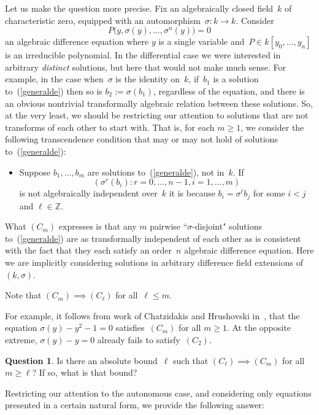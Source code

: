 \documentclass[\DocOpts]{amsart}
\theoremstyle{definition}
\newtheorem*{question*}{Question}
\def\ZZ{\mathbb{Z}}
\newcommand{\<}{\langle}
\renewcommand{\>}{\rangle}
\begin{document}
Let us make the question more precise.
Fix an algebraically closed field~$k$ of characteristic zero, equipped with an automorphism~$\sigma:k\to k$.
Consider
\begin{equation}
\label{generalde}
P\big(y, \sigma(y),\dots,\sigma^n(y)\big)=0\tag{E}
\end{equation}
an algebraic difference equation where $y$ is a single variable and~$P\in k[y_0,\dots,y_n]$ is an irreducible polynomial.
In the differential case we were interested in arbitrary {\em distinct} solutions, but here that would not make much sense.
For example, in the case when~$\sigma$ is the identity on~$k$, if~$b_1$ is a solution to~(\ref{generalde}) then so is $b_2:=\sigma(b_1)$, regardless of the equation, and there is an obvious nontrivial transformally algebraic relation between these solutions. 
So, at the very least, we should be restricting our attention to solutions that are not transforms of each other to start with.
That is, for each $m\geq 1$, we consider the following transcendence condition that may or may not hold of solutions to~(\ref{generalde}):
\begin{itemize}
\item[$(C_m)$]
Suppose $b_1,\dots,b_m$  are solutions to~(\ref{generalde}), not in~$k$.
If
$$(\sigma^r(b_i): r=0,\dots,n-1, i=1,\dots, m)$$
is not algebraically independent over~$k$ it is because $b_i=\sigma^\ell b_j$ for some $i<j$ and $\ell\in\ZZ$.
\end{itemize}
What $(C_m)$ expresses is that any $m$ pairwise ``$\sigma$-disjoint" solutions to~(\ref{generalde}) are as transformally independent of each other as is consistent with the fact that they each satisfy an order~$n$ algebraic difference equation.
Here we are implicitly considering solutions in arbitrary difference field extensions of $(k,\sigma)$.

Note that $(C_m)\implies(C_\ell)$ for all~$\ell\leq m$.

For example, it follows from work of Chatzidakis and Hrushovski in~\cite{acfa}, that the equation $\sigma(y)-y^2-1=0$ satisfies~$(C_m)$ for all $m\geq 1$.
At the opposite extreme, $\sigma(y)-y=0$ already fails to satisfy~$(C_2)$.

\begin{question*}
Is there an absolute bound~$\ell$ such that
$(C_\ell)\implies(C_m)$ for all~$m\geq\ell$?
If so, what is that bound?
\end{question*}

Restricting our attention to the autonomous case, and considering only equations presented in a certain natural form, we provide the following answer:
\end{document}
